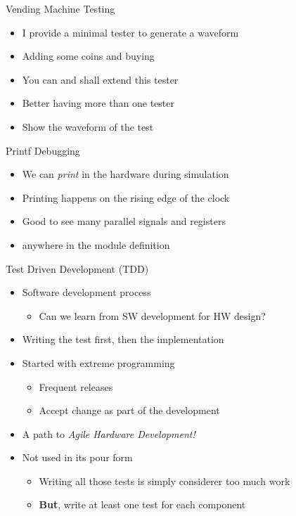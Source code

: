 \begin{frame}[fragile]{Vending Machine Testing}
\begin{itemize}
\item I provide a minimal tester to generate a waveform
\item Adding some coins and buying
\item You can and shall extend this tester
\item Better having more than one tester
\item Show the waveform of the test
\end{itemize}
\end{frame}


\begin{frame}[fragile]{Printf Debugging}
\begin{itemize}
\item We can \emph{print} in the hardware during simulation
\item Printing happens on the rising edge of the clock
\item Good to see many parallel signals and registers
\item {} anywhere in the module definition
\end{itemize}
\end{frame}


\begin{frame}[fragile]{Test Driven Development (TDD)}
\begin{itemize}
\item Software development process
\begin{itemize}
\item Can we learn from SW development for HW design?
\end{itemize}
\item Writing the test first, then the implementation
\item Started with extreme programming
\begin{itemize}
\item Frequent releases
\item Accept change as part of the development
\end{itemize}
\item A path to \emph{Agile Hardware Development!}
\item Not used in its pour form
\begin{itemize}
\item Writing all those tests is simply considerer too much work
\item \textbf{But}, write at least one test for each component
\end{itemize}
\end{itemize}
\end{frame}

